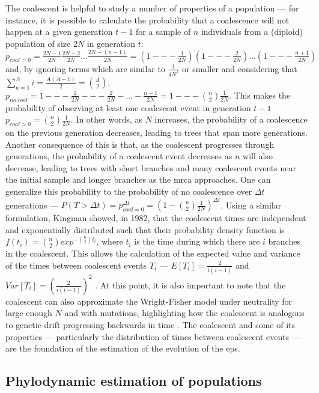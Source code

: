 The coalescent is helpful to study a number of properties of a population --- for instance, it is possible to calculate the probability that a coalescence will not happen at a given generation $t-1$ for a sample of $n$ individuals from a (diploid) population of size $2N$ in generation $t$: $p_{coal=0} = \frac{2N-1}{2N}\frac{2N-2}{2N}...\frac{2N-(n-1)}{2N} = (1 --- \frac{1}{2N})(1 --- \frac{2}{2N})...(1 --- \frac{n+1}{2N})$ and, by ignoring terms which are similar to $\frac{1}{4N^2}$ or smaller and considering that $\sum^A_{a=1}{i} = \frac{A(A-1)}{2} = \binom{A}{2}$, $p_{no\ coal} = 1 --- \frac{1}{2N} --- \frac{2}{2N} -...- \frac{n-1}{2N} = 1 --- \binom{n}{2}\frac{1}{2N}$. This makes the probability of observing at least one coalescent event in generation $t-1$ $p_{coal>0} = \binom{n}{2}\frac{1}{2N}$. In other words, as $N$ increases, the probability of a coalescence on the previous generation decreases, leading to trees that span more generations. Another consequence of this is that, as the coalescent progresses through generations, the probability of a coalescent event decreases as $n$ will also decrease, leading to trees with short branches and many coalescent events near the initial sample and longer branches as the \ac{mrca} approaches. One can generalize this probability to the probability of no coalescence over $\Delta t$ generations --- $P(T > \Delta t) = p_{coal=0}^{\Delta t} = (1-\binom{n}{2}\frac{1}{2N})^{\Delta t}$. Using a similar formulation, Kingman showed, in 1982, that the coalescent times are independent and exponentially distributed such that their probability density function is $f(t_i) = \binom{n}{2}exp^{-\binom{n}{2}t_i}$, where $t_i$ is the time during which there are $i$ branches in the coalescent. This allows the calculation of the expected value and variance of the times between coalescent events $T_i$ --- $E[T_i] = \frac{2}{i(i-1)}$ and $Var[T_i] = (\frac{2}{i(i-1)})^2$ \cite{Kingman1982-tc}. At this point, it is also important to note that the coalescent can also approximate the Wright-Fisher model under neutrality for large enough $N$ and with mutations, highlighting how the coalescent is analogous to genetic drift progressing backwards in time \cite{Wakeley2008-wh}. The coalescent and some of its properties --- particularly the distribution of times between coalescent events --- are the foundation of the estimation of the evolution of the \ac{eps}.

\subsection{Phylodynamic estimation of populations}

